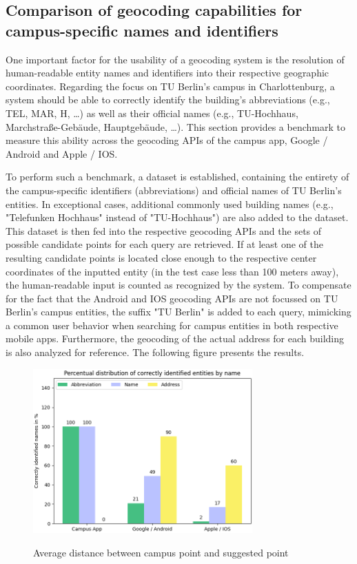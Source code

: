 \subsection{Comparison of geocoding capabilities for campus-specific names and identifiers}
One important factor for the usability of a geocoding system is the resolution of human-readable entity names and identifiers into their respective geographic coordinates. Regarding the focus on TU Berlin's campus in Charlottenburg, a system should be able to correctly identify the building's abbreviations (e.g., TEL, MAR, H, \ldots) as well as their official names (e.g., TU-Hochhaus, Marchstraße-Gebäude, Hauptgebäude, \ldots). This section provides a benchmark to measure this ability across the geocoding APIs of the campus app, Google / Android and Apple / IOS.

To perform such a benchmark, a dataset is established, containing the entirety of the campus-specific identifiers (abbreviations) and official names of TU Berlin's entities. In exceptional cases, additional commonly used building names (e.g., "Telefunken Hochhaus" instead of "TU-Hochhaus") are also added to the dataset. This dataset is then fed into the respective geocoding APIs and the sets of possible candidate points for each query are retrieved. If at least one of the resulting candidate points is located close enough to the respective center coordinates of the inputted entity (in the test case less than 100 meters away), the human-readable input is counted as recognized by the system. To compensate for the fact that the Android and IOS geocoding APIs are not focussed on TU Berlin's campus entities, the suffix "TU Berlin" is added to each query, mimicking a common user behavior when searching for campus entities in both respective mobile apps. Furthermore, the geocoding of the actual address for each building is also analyzed for reference. The following figure presents the results.

\begin{figure}[H]
	\centering
	\includegraphics[width=0.75\textwidth]{images/results_geocoding_identifiers.png}\\
	\caption{Average distance between campus point and suggested point}
\end{figure}

